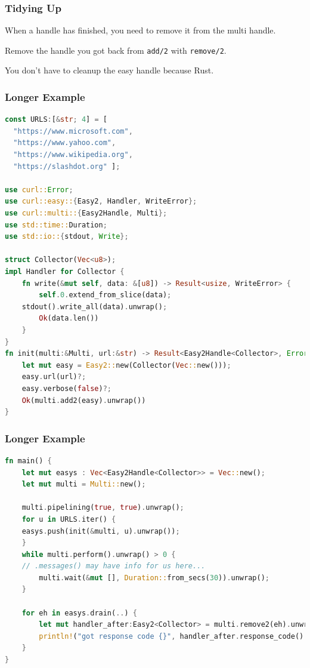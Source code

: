 \begin{frame}
\frametitle{Tidying Up}

When a handle has finished, you need to remove it from the multi handle.

 Remove the handle you got back from \texttt{add/2} with \texttt{remove/2}. 
 
 You don't have to cleanup the easy handle because Rust.


\end{frame}


\begin{frame}[fragile]
\frametitle{Longer Example}

\begin{lstlisting}[language=Rust]
const URLS:[&str; 4] = [
  "https://www.microsoft.com",
  "https://www.yahoo.com",
  "https://www.wikipedia.org",
  "https://slashdot.org" ];

use curl::Error;
use curl::easy::{Easy2, Handler, WriteError};
use curl::multi::{Easy2Handle, Multi};
use std::time::Duration;
use std::io::{stdout, Write};

struct Collector(Vec<u8>);
impl Handler for Collector {
    fn write(&mut self, data: &[u8]) -> Result<usize, WriteError> {
        self.0.extend_from_slice(data);
	stdout().write_all(data).unwrap();
        Ok(data.len())
    }
}
fn init(multi:&Multi, url:&str) -> Result<Easy2Handle<Collector>, Error> {
    let mut easy = Easy2::new(Collector(Vec::new()));
    easy.url(url)?;
    easy.verbose(false)?;
    Ok(multi.add2(easy).unwrap())
}
\end{lstlisting}

\end{frame}


\begin{frame}[fragile]
\frametitle{Longer Example}

\begin{lstlisting}[language=Rust]
fn main() {
    let mut easys : Vec<Easy2Handle<Collector>> = Vec::new();
    let mut multi = Multi::new();
    
    multi.pipelining(true, true).unwrap();
    for u in URLS.iter() {
	easys.push(init(&multi, u).unwrap());
    }
    while multi.perform().unwrap() > 0 {
	// .messages() may have info for us here...
        multi.wait(&mut [], Duration::from_secs(30)).unwrap();
    }

    for eh in easys.drain(..) {
    	let mut handler_after:Easy2<Collector> = multi.remove2(eh).unwrap();
        println!("got response code {}", handler_after.response_code().unwrap());
    }
}
\end{lstlisting}


\end{frame}

